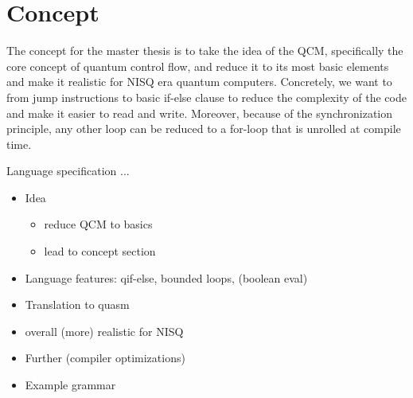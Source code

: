 \chapter{Concept}

The concept for the master thesis is to take the idea of the QCM, specifically the core concept of quantum control flow, and reduce it to its most basic elements and make it realistic for NISQ era quantum computers. Concretely, we want to from jump instructions to basic if-else clause to reduce the complexity of the code and make it easier to read and write. Moreover, because of the synchronization principle, any other loop can be reduced to a for-loop that is unrolled at compile time.

Language specification ...
\begin{itemize}
    \item Idea  
    \begin{itemize}
        \item reduce QCM to basics
        \item lead to concept section
    \end{itemize}
    \item Language features: qif-else, bounded loops, (boolean eval)
    \item Translation to quasm
    \item overall (more) realistic for NISQ 
    \item Further (compiler optimizations)
    \item Example grammar
\end{itemize}


